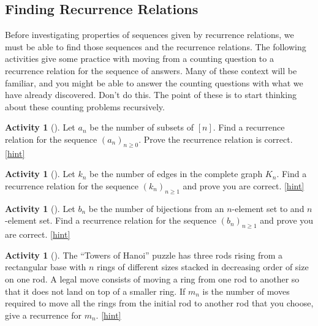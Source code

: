 \documentclass[10pt,]{book}
\theoremstyle{plain}
\theoremstyle{definition}
\theoremstyle{definition}
\theoremstyle{definition}
\newtheorem{activity}[project]{Activity}
\numberwithin{equation}{chapter}
\begin{document}
\subsection[{Finding Recurrence Relations}]{Finding Recurrence Relations}\label{subsec-recursionfinding}
\hypertarget{p-891}{}%
Before investigating properties of sequences given by recurrence relations, we must be able to find those sequences and the recurrence relations.  The following activities give some practice with moving from a counting question to a recurrence relation for the sequence of answers.  Many of these context will be familiar, and you might be able to answer the counting questions with what we have already discovered.  Don't do this.  The point of these is to start thinking about these counting problems recursively.%
\begin{activity}[]\label{activity-127}
\hypertarget{p-892}{}%
Let \(a_n\) be the number of subsets of \([n]\).  Find a recurrence relation for the sequence \((a_n)_{n \ge 0}\).  Prove the recurrence relation is correct.%
\hfill{\tiny\hyperlink{a-134}{[hint]}\hypertarget{q-134}{}}\end{activity}
\begin{activity}[]\label{activity-128}
\hypertarget{p-894}{}%
Let \(k_n\) be the number of edges in the complete graph \(K_n\).  Find a recurrence relation for the sequence \((k_n)_{n \ge 1}\) and prove you are correct.%
\hfill{\tiny\hyperlink{a-135}{[hint]}\hypertarget{q-135}{}}\end{activity}
\begin{activity}[]\label{activity-129}
\hypertarget{p-896}{}%
Let \(b_n\) be the number of bijections from an \(n\)-element set to and \(n\)-element set.  Find a recurrence relation for the sequence \((b_n)_{n \ge 1}\) and prove you are correct.%
\hfill{\tiny\hyperlink{a-136}{[hint]}\hypertarget{q-136}{}}\end{activity}
\begin{activity}[]\label{HanoiProblem}
\hypertarget{p-898}{}%
The ``Towers of Hanoi'' puzzle has three rods rising from a rectangular base with \(n\) rings of different sizes stacked in decreasing order of size on one rod. A legal move consists of moving a ring from one rod to another so that it does not land on top of a smaller ring. If \(m_n\) is the number of moves required to move all the rings from the initial rod to another rod that you choose, give a recurrence for \(m_n\).%
\hfill{\tiny\hyperlink{a-137}{[hint]}\hypertarget{q-137}{}}\end{activity}
\end{document}
